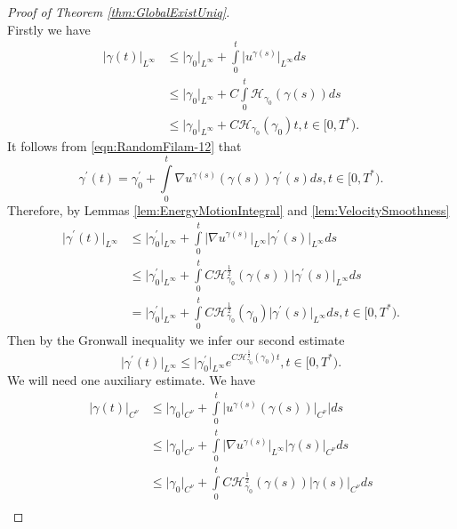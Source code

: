 \documentclass[11pt,a4paper,leqno]{amsart}%
\newcommand\half{\frac12}
\theoremstyle{plain}
\theoremstyle{remark}
\theoremstyle{plain}
\numberwithin{equation}{section}
\def\intl{\int\limits}
\begin{document}
\begin{proof}[Proof of Theorem \ref{thm:GlobalExistUniq}]
\begin{equation}
\end{equation}
Firstly we have
\begin{align}
\vert \gamma(t)\vert_{L^{\infty}}&\leq\vert \gamma_0\vert_{L^{\infty}}+\intl_0^t\vert u^{\gamma(s)}\vert_{L^{\infty}}ds\nonumber\\
&\leq\vert \gamma_0\vert_{L^{\infty}}+C\intl_0^t\mathcal{H}_{\gamma_0}(\gamma(s))ds\nonumber\\
&\leq\vert \gamma_0\vert_{L^{\infty}}+C\mathcal{H}_{\gamma_0}(\gamma_0)t,t\in[0,T^*).\label{eqn:GEUEstim-1}
\end{align}
It follows from \eqref{eqn:RandomFilam-12} that
\begin{equation}
\gamma^\prime(t)=\gamma_0^\prime+\intl_0^t\nabla
u^{\gamma(s)}(\gamma(s))\gamma^\prime(s)ds,t\in[0,T^*).\label{eqn:RandomFilam-12'}
\end{equation}
Therefore, by Lemmas \ref{lem:EnergyMotionIntegral} and
\ref{lem:VelocitySmoothness}
\begin{align}
\vert \gamma^\prime(t)\vert_{L^{\infty}}&\leq\vert \gamma^\prime_0\vert_{L^{\infty}}+\intl_0^t\vert \nabla
u^{\gamma(s)}\vert_{L^{\infty}}\vert \gamma^\prime(s)\vert_{L^{\infty}}ds\nonumber\\
&\leq\vert \gamma^\prime_0\vert_{L^{\infty}}+\intl_0^tC\mathcal{H}_{\gamma_0}^{\half}(\gamma(s))\vert \gamma^\prime(s)\vert_{L^{\infty}}ds\nonumber\\
&=\vert \gamma^\prime_0\vert_{L^{\infty}}+\intl_0^tC\mathcal{H}_{\gamma_0}^{\half}(\gamma_0)\vert \gamma^\prime(s)\vert_{L^{\infty}}ds,t\in[0,T^*).
\end{align}
Then by the Gronwall inequality we infer our second estimate
\begin{equation}
\vert \gamma^\prime(t)\vert_{L^{\infty}}\leq\vert \gamma^\prime_0\vert_{L^{\infty}}e^{C\mathcal{H}_{\gamma_0}^{\half}(\gamma_0)t},t\in[0,T^*).\label{eqn:GEUEstim-2}
\end{equation}
We will need one auxiliary estimate. We have
\begin{align}
\vert \gamma(t)\vert_{C^{\nu}}&\leq\vert \gamma_0\vert_{C^{\nu}}+\intl_0^t\vert
u^{\gamma(s)}(\gamma(s))\vert_{C^{\nu}}\vert ds\nonumber\\
&\leq\vert \gamma_0\vert_{C^{\nu}}+\intl_0^t\vert \nabla
u^{\gamma(s)}\vert_{L^{\infty}}\vert \gamma(s)\vert_{C^{\nu}}ds\nonumber\\
&\leq
\vert \gamma_0\vert_{C^{\nu}}+\intl_0^tC\mathcal{H}_{\gamma_0}^{\half}(\gamma(s))\vert \gamma(s)\vert_{C^{\nu}}ds\nonumber\\

\end{align}
\end{proof}
\end{document}
